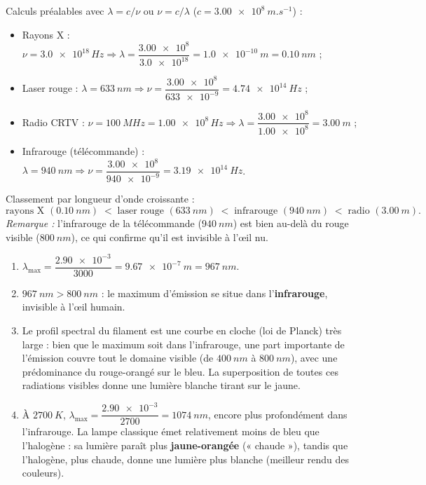 \documentclass[11pt]{article}
\newcommand{\cle}[1]{{\popxbold\color{popdark}#1}}
\begin{document}
\begin{corrige}
Calculs préalables avec $\lambda = c/\nu$ ou $\nu = c/\lambda$ ($c = \SI{3,00e8}{m.s^{-1}}$) :
\begin{itemize}
\item Rayons X : $\nu = \num{3,0e18}\,Hz \Rightarrow \lambda = \dfrac{\num{3,00e8}}{\num{3,0e18}} = \SI{1,0e-10}{m} = \SI{0,10}{nm}$ ;
\item Laser rouge : $\lambda = \SI{633}{nm} \Rightarrow \nu = \dfrac{\num{3,00e8}}{\num{633e-9}} = \SI{4,74e14}{Hz}$ ;
\item Radio CRTV : $\nu = \SI{100}{MHz} = \num{1,00e8}\,Hz \Rightarrow \lambda = \dfrac{\num{3,00e8}}{\num{1,00e8}} = \SI{3,00}{m}$ ;
\item Infrarouge (télécommande) : $\lambda = \SI{940}{nm} \Rightarrow \nu = \dfrac{\num{3,00e8}}{\num{940e-9}} = \SI{3,19e14}{Hz}$.
\end{itemize}
Classement par \cle{longueur d'onde croissante} :
\[ \text{rayons X } (\SI{0,10}{nm}) \;<\; \text{laser rouge } (\SI{633}{nm}) \;<\; \text{infrarouge } (\SI{940}{nm}) \;<\; \text{radio } (\SI{3,00}{m}). \]
\emph{Remarque :} l'infrarouge de la télécommande ($\SI{940}{nm}$) est bien au-delà du rouge visible ($\SI{800}{nm}$), ce qui confirme qu'il est invisible à l'œil nu.
\end{corrige}

\begin{corrige}
\begin{enumerate}
\item $\lambda_{\max} = \dfrac{\num{2,90e-3}}{3000} = \SI{9,67e-7}{m} = \SI{967}{nm}$.
\item $\SI{967}{nm} > \SI{800}{nm}$ : le maximum d'émission se situe dans l'\textbf{infrarouge}, invisible à l'œil humain.
\item Le profil spectral du filament est une \cle{courbe en cloche} (loi de Planck) très large : bien que le maximum soit dans l'infrarouge, une part importante de l'émission couvre tout le domaine visible (de $\SI{400}{nm}$ à $\SI{800}{nm}$), avec une prédominance du rouge-orangé sur le bleu. La superposition de toutes ces radiations visibles donne une lumière blanche tirant sur le jaune.
\item À $\SI{2700}{K}$, $\lambda_{\max} = \dfrac{\num{2,90e-3}}{2700} = \SI{1074}{nm}$, encore plus profondément dans l'infrarouge. La lampe classique émet relativement moins de bleu que l'halogène : sa lumière paraît plus \textbf{jaune-orangée} (« chaude »), tandis que l'halogène, plus chaude, donne une lumière plus blanche (meilleur \cle{rendu des couleurs}).
\end{enumerate}
\end{corrige}
\end{document}
